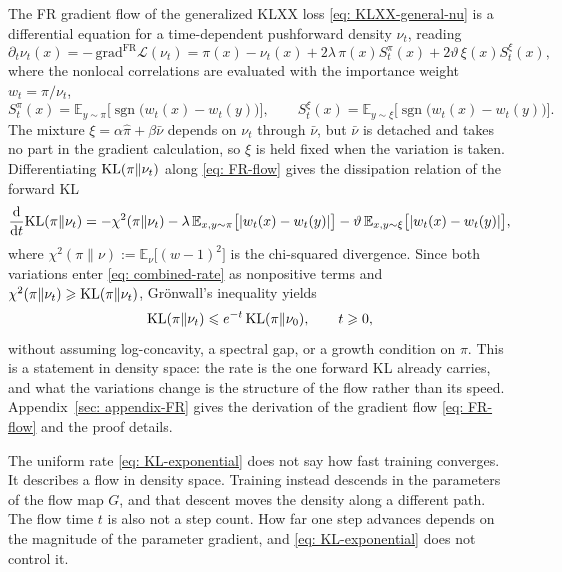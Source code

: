 \documentclass{article}
\begin{document}
The FR gradient flow of the generalized KLXX loss \eqref{eq: KLXX-general-nu} is a differential equation for a time-dependent pushforward density $\nu_t$, reading
\begin{equation}
	\partial_t\nu_t(x) = -\,\mathrm{grad}^{\mathrm{FR}}\mathcal L(\nu_t) = \pi(x)-\nu_t(x) + 2\lambda\,\pi(x)S^{\pi}_t(x) + 2\vartheta\,\xi(x)S^{\xi}_t(x),
	\label{eq: FR-flow}
\end{equation}
where the nonlocal correlations are evaluated with the importance weight $w_t=\pi/\nu_t$,
\begin{equation}
	S^{\pi}_t(x) = \mathbb E_{y\sim\pi}\bigl[\operatorname{sgn}\bigl(w_t(x)-w_t(y)\bigr)\bigr],
	\qquad
	S^{\xi}_t(x) = \mathbb E_{y\sim\xi}\bigl[\operatorname{sgn}\bigl(w_t(x)-w_t(y)\bigr)\bigr].
	\label{eq: FR-S-t}
\end{equation}
{\color{blue}The mixture $\xi=\alpha\hat\pi+\beta\bar\nu$ depends on $\nu_t$ through $\bar\nu$, but $\bar\nu$ is detached and takes no part in the gradient calculation, so $\xi$ is held fixed when the variation is taken.} Differentiating $\mathrm{KL}(\pi\|\nu_t)$ along \eqref{eq: FR-flow} gives the dissipation relation of the forward KL
\begin{equation}
	\frac{\mathrm{d}}{\mathrm{d} t}\mathrm{KL}(\pi\|\nu_t) = -\chi^2(\pi\|\nu_t)
	- \lambda\,\mathbb E_{x,y\sim\pi}\bigl[|w_t(x)-w_t(y)|\bigr]
	- \vartheta\,\mathbb E_{x,y\sim\xi}\bigl[|w_t(x)-w_t(y)|\bigr],
	\label{eq: combined-rate}
\end{equation}
where $\chi^2(\pi\|\nu):=\mathbb E_{\nu}\bigl[(w-1)^2\bigr]$ is the chi-squared divergence. Since both variations {\color{blue}enter \eqref{eq: combined-rate} as nonpositive terms} and $\chi^2(\pi\|\nu_t)\geqslant\mathrm{KL}(\pi\|\nu_t)$, Gr\"onwall's inequality yields
\begin{equation}
	\mathrm{KL}(\pi\|\nu_t) \leqslant e^{-t}\,\mathrm{KL}(\pi\|\nu_0), \qquad t \geqslant 0,
	\label{eq: KL-exponential}
\end{equation}
without assuming log-concavity, a spectral gap, or a growth condition on $\pi$. This is a statement in density space: the rate is the one forward KL already carries, and what the variations change is the structure of the flow rather than its speed. Appendix~\ref{sec: appendix-FR} gives the derivation of the gradient flow \eqref{eq: FR-flow} and the proof details.

\begin{remark}
	The uniform rate \eqref{eq: KL-exponential} does not say how fast training converges. It describes a flow in density space. Training instead descends in the parameters of the flow map $G$, and that descent moves the density along a different path. The flow time $t$ is also not a step count. How far one step advances depends on the magnitude of the parameter gradient, and \eqref{eq: KL-exponential} does not control it.
\end{remark}
\end{document}

